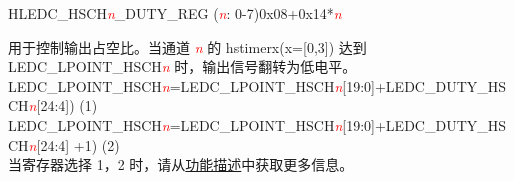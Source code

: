 \begin{register}{H}{LEDC\_HSCH\textit{\textcolor{red}{\it{n}}}\_DUTY\_REG (\textit{\textcolor{red}{\it{n}}}: 0-7)}{0x08+0x14*\textit{\textcolor{red}{\it{n}}}}\label{regdesc:LEDCHSCHnDUTYREG}
%
%
\regnewline%
\begin{regdesc}\begin{reglist}
\item [LEDC\_DUTY\_HSCH\textcolor{red}{\it{n}}]\label{regdesc:LEDCDUTYHSCHn} 用于控制输出占空比。当通道 \textcolor{red}{\it{n}} 的 hstimerx(x=[0,3]) 达到 LEDC\_LPOINT\_HSCH\textcolor{red}{\it{n}} 时，输出信号翻转为低电平。\\ LEDC\_LPOINT\_HSCH\textcolor{red}{\it{n}}=LEDC\_LPOINT\_HSCH\textcolor{red}{\it{n}}[19:0]+LEDC\_DUTY\_HSCH\textcolor{red}{\it{n}}[24:4])          (1) \\
LEDC\_LPOINT\_HSCH\textcolor{red}{\it{n}}=LEDC\_LPOINT\_HSCH\textcolor{red}{\it{n}}[19:0]+LEDC\_DUTY\_HSCH\textcolor{red}{\it{n}}[24:4] +1)     (2)  \\
当寄存器选择 1，2 时，请从\hyperref[ledcfd:dithering]{功能描述}中获取更多信息。
\end{reglist}\end{regdesc}
\end{register}


